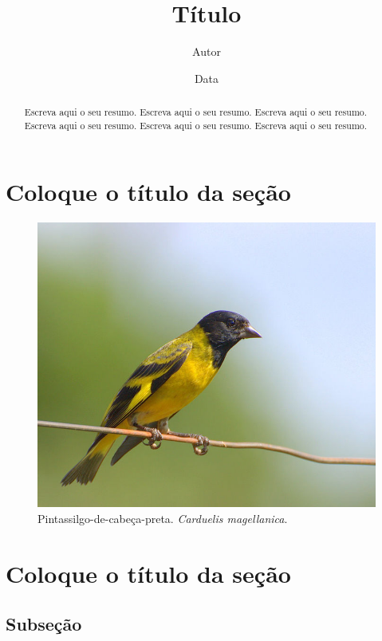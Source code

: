 \documentclass[a4paper,twoside]{article} %
\title{Título}
\author{Autor}
\date{Data}
\begin{document}
\frenchspacing

\maketitle

\begin{abstract}
Escreva aqui o seu resumo. Escreva aqui o seu resumo. Escreva aqui o seu resumo. Escreva aqui o seu resumo. Escreva aqui o seu resumo. Escreva aqui o seu resumo.
\end{abstract}

\tableofcontents %
\listoffigures %


\section{Coloque o título da seção}
\lipsum[1-5]


\begin{figure}
\centering
\includegraphics[width=0.5\linewidth]{pintassilgo}
\caption{Pintassilgo-de-cabeça-preta. \textit{Carduelis magellanica}.}
\label{pintassilgo}
\end{figure}



\section{Coloque o título da seção}
\lipsum[1]

\subsection{Subseção}
\end{document}
